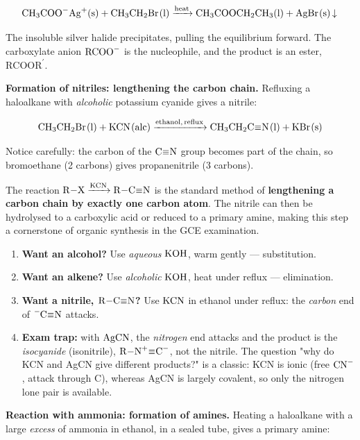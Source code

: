 \documentclass[11pt]{article}
\newcommand{\cle}[1]{{\popxbold\color{popdark}#1}}
\begin{document}
\[ \ce{CH3COO^-Ag+(s) + CH3CH2Br(l) ->[heat] CH3COOCH2CH3(l) + AgBr(s) v} \]

The insoluble silver halide precipitates, pulling the equilibrium forward. The carboxylate anion $\ce{RCOO^-}$ is the nucleophile, and the product is an ester, $\ensuremath{\mathrm{RCOOR^{\prime}}}$.

\textbf{Formation of nitriles: lengthening the carbon chain.} Refluxing a haloalkane with \emph{alcoholic} potassium cyanide gives a \cle{nitrile}:

\[ \ce{CH3CH2Br(l) + KCN(alc) ->[ethanol, reflux] CH3CH2C#N(l) + KBr(s)} \]

Notice carefully: the carbon of the $\ce{C#N}$ group becomes part of the chain, so bromoethane (2 carbons) gives propanenitrile (3 carbons).

\begin{propriete}
The reaction $\ce{R-X ->[KCN] R-C#N}$ is the standard method of \textbf{lengthening a carbon chain by exactly one carbon atom}. The nitrile can then be hydrolysed to a carboxylic acid or reduced to a primary amine, making this step a cornerstone of organic synthesis in the GCE examination.
\end{propriete}

\begin{methode}
\begin{enumerate}
\item \textbf{Want an alcohol?} Use \emph{aqueous} $\ce{KOH}$, warm gently --- substitution.
\item \textbf{Want an alkene?} Use \emph{alcoholic} $\ce{KOH}$, heat under reflux --- elimination.
\item \textbf{Want a nitrile, $\ce{R-C#N}$?} Use $\ce{KCN}$ in ethanol under reflux: the \emph{carbon} end of $\ce{^-C#N}$ attacks.
\item \textbf{Exam trap:} with $\ce{AgCN}$, the \emph{nitrogen} end attacks and the product is the \emph{isocyanide} (isonitrile), $\ce{R-N^+#C^-}$, not the nitrile. The question "why do KCN and AgCN give different products?" is a classic: KCN is ionic (free $\ce{CN^-}$, attack through C), whereas AgCN is largely covalent, so only the nitrogen lone pair is available.
\end{enumerate}
\end{methode}

\textbf{Reaction with ammonia: formation of amines.} Heating a haloalkane with a large \emph{excess} of ammonia in ethanol, in a sealed tube, gives a primary amine:
\end{document}
